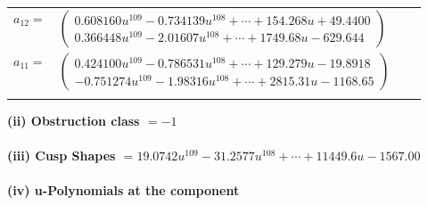 \documentclass[1p]{elsarticle_modified}
\theoremstyle{definition}
\begin{document}
\begin{tabular}{m{7pt} m{180pt} m{7pt} m{180pt} }
\flushright $a_{12}=$&$\begin{pmatrix}0.608160 u^{109}-0.734139 u^{108}+\cdots+154.268 u+49.4400\\0.366448 u^{109}-2.01607 u^{108}+\cdots+1749.68 u-629.644\end{pmatrix}$ \\
\flushright $a_{11}=$&$\begin{pmatrix}0.424100 u^{109}-0.786531 u^{108}+\cdots+129.279 u-19.8918\\-0.751274 u^{109}-1.98316 u^{108}+\cdots+2815.31 u-1168.65\end{pmatrix}$\\&\end{tabular}
\flushleft \textbf{(ii) Obstruction class $= -1$}\\~\\
\flushleft \textbf{(iii) Cusp Shapes $= 19.0742 u^{109}-31.2577 u^{108}+\cdots+11449.6 u-1567.00$}\\~\\
\newpage\renewcommand{\arraystretch}{1}
\flushleft \textbf{(iv) u-Polynomials at the component}\newline \\
\end{document}
